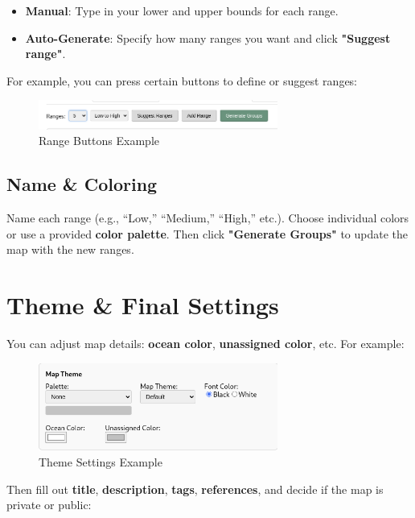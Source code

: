 \documentclass{article}
\begin{document}
\begin{itemize}
  \item \textbf{Manual}: Type in your lower and upper bounds for each range.
  \item \textbf{Auto-Generate}: Specify how many ranges you want and click
        \textbf{"Suggest range"}.
\end{itemize}

\noindent
For example, you can press certain buttons to define or suggest ranges:

\begin{figure}[h!]
  \centering
  \includegraphics[width=0.7\textwidth]{range_buttons.png}
  \caption{Range Buttons Example}
\end{figure}

\subsection{Name \& Coloring}

Name each range (e.g., “Low,” “Medium,” “High,” etc.). Choose individual colors or 
use a provided \textbf{color palette}. Then click \textbf{"Generate Groups"} to 
update the map with the new ranges.

\section{Theme \& Final Settings}

You can adjust map details: \textbf{ocean color}, \textbf{unassigned color}, etc. 
For example:

\begin{figure}[h!]
  \centering
  \includegraphics[width=0.7\textwidth]{map_theme.png}
  \caption{Theme Settings Example}
\end{figure}

Then fill out \textbf{title}, \textbf{description}, \textbf{tags}, 
\textbf{references}, and decide if the map is private or public:
\end{document}
